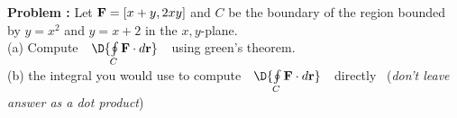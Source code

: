 {\bf Problem :} Let $\text{\bf F} = [x+y,2xy]$ and $C$ be the boundary of the region bounded by $y=x^2$ and $y=x+2$ in the $x,y$-plane. \\
(a) Compute \,\, $\D{\oint \limits_{C} \text{\bf F}\cdot d\text{\bf r}}$ \,\, using green's theorem.\\
(b)  the integral you would use to compute \,\, $\D{\oint \limits_{C} \text{\bf F}\cdot d\text{\bf r}}$ \,\, directly \,\,\,({\em don't leave answer as a dot product})
